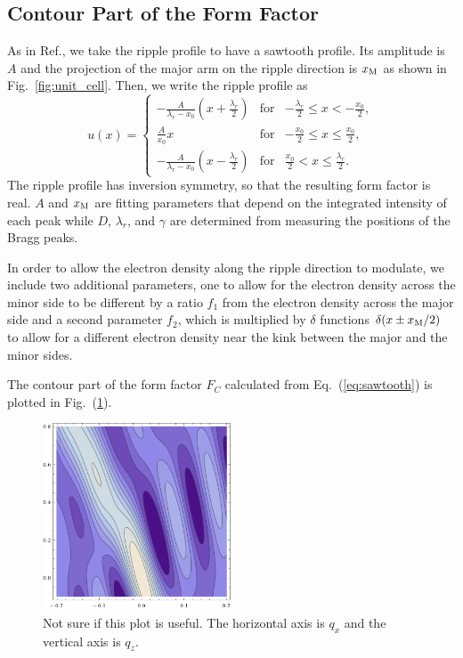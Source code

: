 \subsection{Contour Part of the Form Factor}\label{sec:contour}
As in Ref.\cite{ref:Sun96}, we take the ripple profile to have a sawtooth profile. Its
amplitude is $A$ and the projection of the major arm on the 
ripple direction is $x_\textrm{M}$ as shown in Fig.~\ref{fig:unit_cell}. 
Then, we write the ripple profile as
\begin{equation}
  u(x) = \left\{
    \begin{array}{ccc}
    -\frac{A}{\lambda_r-x_0}\left(x+\frac{\lambda_r}{2}\right) 
      & \text{for} 
      & -\frac{\lambda_r}{2} \leq x < -\frac{x_0}{2}, \\
    \frac{A}{x_0}x 
      & \text{for} 
      & -\frac{x_0}{2} \leq x \leq \frac{x_0}{2}, \\
    -\frac{A}{\lambda_r-x_0} \left(x-\frac{\lambda_r}{2}\right)
      & \text{for} 
      & \frac{x_0}{2} < x \leq \frac{\lambda_r}{2}.
    \end{array} \right.
  \label{eq:sawtooth}
\end{equation}
The ripple profile has inversion symmetry, so that the resulting
form factor is real. $A$ and $x_\textrm{M}$ are fitting parameters that depend 
on the integrated intensity of each peak while $D$, $\lambda_r$, and $\gamma$
are determined from measuring the positions of the Bragg peaks.

In order to allow the electron density along the ripple direction to 
modulate, we include two additional parameters, one to allow for the electron
density across the minor side to be different by a ratio $f_1$ from the 
electron density across the major side and a second parameter $f_2$, which
is multiplied by $\delta$ functions $\delta(x \pm x_\textrm{M}/2)$ to allow for 
a different electron density near the kink between the major and the minor
sides. 

The contour part of the form factor $F_C$ calculated from Eq.~(\ref{eq:sawtooth})
is plotted in Fig.~(\ref{fig:FT}).

\begin{figure}
  \centering
  \includegraphics[width=0.5\textwidth]{figures/ripple/model/F_contour}
  \caption[title goes here]{Not sure if this plot is useful.
  The horizontal axis is $q_x$ and the vertical axis is $q_z$.}
  \label{fig:FT}
\end{figure}

